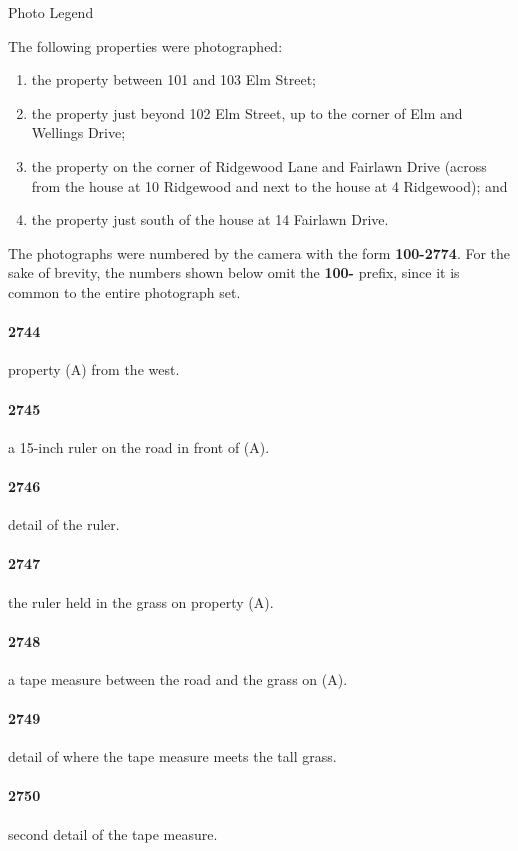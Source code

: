\documentclass[12pt]{article}
\begin{document}
\begin{center}
{\Huge Photo Legend}
\end{center}

\noindent The following properties were photographed:
\renewcommand{\labelenumi}{(\Alph{enumi})}
\begin{enumerate}
\item the property between 101 and 103 Elm Street;
\item the property just beyond 102 Elm Street, up to the corner of Elm and Wellings Drive;
\item the property on the corner of Ridgewood Lane and Fairlawn Drive (across from the house at 10 Ridgewood and next to the house at 4 Ridgewood); and
\item the property just south of the house at 14 Fairlawn Drive.
\end{enumerate}
The photographs were numbered by the camera with the form {\bf 100-2774}.
For the sake of brevity, the numbers shown below omit the {\bf 100-} prefix, since it is common to the entire photograph set.



\paragraph{2744} property (A) from the west.
\paragraph{2745} a 15-inch ruler on the road in front of (A).
\paragraph{2746} detail of the ruler.
\paragraph{2747} the ruler held in the grass on property (A).
\paragraph{2748} a tape measure between the road and the grass on (A).
\paragraph{2749} detail of where the tape measure meets the tall grass.
\paragraph{2750} second detail of the tape measure.
\end{document}

